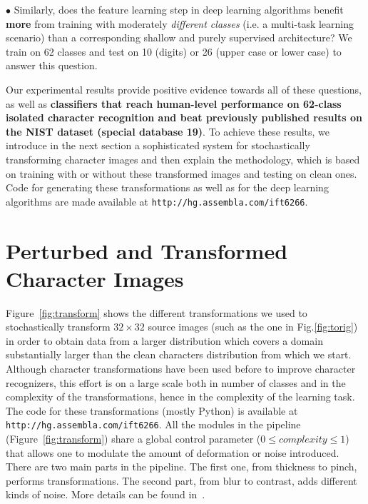 \documentclass{article} %
\begin{document}
$\bullet$ %
Similarly, does the feature learning step in deep learning algorithms benefit {\bf more}
from training with moderately {\em different classes} (i.e. a multi-task learning scenario) than
a corresponding shallow and purely supervised architecture?
We train on 62 classes and test on 10 (digits) or 26 (upper case or lower case)
to answer this question.

Our experimental results provide positive evidence towards all of these questions,
as well as {\bf classifiers that reach human-level performance on 62-class isolated character
recognition and beat previously published results on the NIST dataset (special database 19)}.
To achieve these results, we introduce in the next section a sophisticated system
for stochastically transforming character images and then explain the methodology,
which is based on training with or without these transformed images and testing on 
clean ones. 
Code for generating these transformations as well as for the deep learning 
algorithms are made available at 
{\tt http://hg.assembla.com/ift6266}.

\section{Perturbed and Transformed Character Images}
\label{s:perturbations}

Figure~\ref{fig:transform} shows the different transformations we used to stochastically
transform $32 \times 32$ source images (such as the one in Fig.\ref{fig:torig})
in order to obtain data from a larger distribution which
covers a domain substantially larger than the clean characters distribution from
which we start.
Although character transformations have been used before to
improve character recognizers, this effort is on a large scale both
in number of classes and in the complexity of the transformations, hence
in the complexity of the learning task.
The code for these transformations (mostly Python) is available at 
{\tt http://hg.assembla.com/ift6266}. All the modules in the pipeline (Figure~\ref{fig:transform}) share
a global control parameter ($0 \le complexity \le 1$) that allows one to modulate the
amount of deformation or noise introduced. 
There are two main parts in the pipeline. The first one,
from thickness to pinch, performs transformations. The second
part, from blur to contrast, adds different kinds of noise.
More details can be found in~\citet{ARXIV-2010}.
\end{document}

